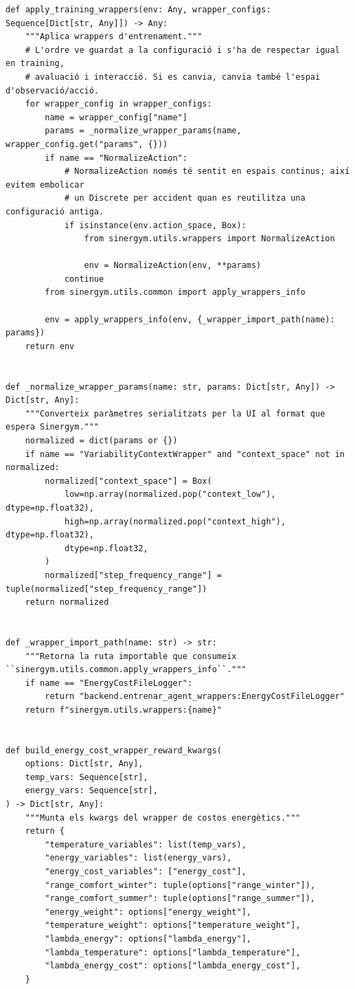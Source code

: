 \documentclass[10pt,a4paper]{article}
\begin{document}
\begin{lstlisting}[style=studioPython,caption={backend/entrenar\_agent\_wrappers.py},label={lst:backend-entrenar-agent-wrappers-py}]
def apply_training_wrappers(env: Any, wrapper_configs: Sequence[Dict[str, Any]]) -> Any:
    """Aplica wrappers d'entrenament."""
    # L'ordre ve guardat a la configuració i s'ha de respectar igual en training,
    # avaluació i interacció. Si es canvia, canvia també l'espai d'observació/acció.
    for wrapper_config in wrapper_configs:
        name = wrapper_config["name"]
        params = _normalize_wrapper_params(name, wrapper_config.get("params", {}))
        if name == "NormalizeAction":
            # NormalizeAction només té sentit en espais continus; així evitem embolicar
            # un Discrete per accident quan es reutilitza una configuració antiga.
            if isinstance(env.action_space, Box):
                from sinergym.utils.wrappers import NormalizeAction

                env = NormalizeAction(env, **params)
            continue
        from sinergym.utils.common import apply_wrappers_info

        env = apply_wrappers_info(env, {_wrapper_import_path(name): params})
    return env


def _normalize_wrapper_params(name: str, params: Dict[str, Any]) -> Dict[str, Any]:
    """Converteix paràmetres serialitzats per la UI al format que espera Sinergym."""
    normalized = dict(params or {})
    if name == "VariabilityContextWrapper" and "context_space" not in normalized:
        normalized["context_space"] = Box(
            low=np.array(normalized.pop("context_low"), dtype=np.float32),
            high=np.array(normalized.pop("context_high"), dtype=np.float32),
            dtype=np.float32,
        )
        normalized["step_frequency_range"] = tuple(normalized["step_frequency_range"])
    return normalized


def _wrapper_import_path(name: str) -> str:
    """Retorna la ruta importable que consumeix ``sinergym.utils.common.apply_wrappers_info``."""
    if name == "EnergyCostFileLogger":
        return "backend.entrenar_agent_wrappers:EnergyCostFileLogger"
    return f"sinergym.utils.wrappers:{name}"


def build_energy_cost_wrapper_reward_kwargs(
    options: Dict[str, Any],
    temp_vars: Sequence[str],
    energy_vars: Sequence[str],
) -> Dict[str, Any]:
    """Munta els kwargs del wrapper de costos energètics."""
    return {
        "temperature_variables": list(temp_vars),
        "energy_variables": list(energy_vars),
        "energy_cost_variables": ["energy_cost"],
        "range_comfort_winter": tuple(options["range_winter"]),
        "range_comfort_summer": tuple(options["range_summer"]),
        "energy_weight": options["energy_weight"],
        "temperature_weight": options["temperature_weight"],
        "lambda_energy": options["lambda_energy"],
        "lambda_temperature": options["lambda_temperature"],
        "lambda_energy_cost": options["lambda_energy_cost"],
    }



\end{lstlisting}
\end{document}
